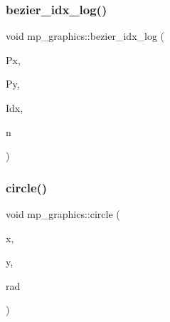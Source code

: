 \mbox{\label{classmp__graphics_a7f1683ce5b50f629b40e8116c8c866c1}} 
\subsubsection{\texorpdfstring{bezier\+\_\+idx\+\_\+log()}{bezier\_idx\_log()}}
{\footnotesize\ttfamily void mp\+\_\+graphics\+::bezier\+\_\+idx\+\_\+log (\begin{DoxyParamCaption}\item[{\mbox{\hyperlink{galois_8h_a09fddde158a3a20bd2dcadb609de11dc}{I\+NT}} $\ast$}]{Px,  }\item[{\mbox{\hyperlink{galois_8h_a09fddde158a3a20bd2dcadb609de11dc}{I\+NT}} $\ast$}]{Py,  }\item[{\mbox{\hyperlink{galois_8h_a09fddde158a3a20bd2dcadb609de11dc}{I\+NT}} $\ast$}]{Idx,  }\item[{\mbox{\hyperlink{galois_8h_a09fddde158a3a20bd2dcadb609de11dc}{I\+NT}}}]{n }\end{DoxyParamCaption})}

\mbox{\label{classmp__graphics_a0e1e32cdfd93dd41678a1dda2671ab6e}} 
\subsubsection{\texorpdfstring{circle()}{circle()}}
{\footnotesize\ttfamily void mp\+\_\+graphics\+::circle (\begin{DoxyParamCaption}\item[{\mbox{\hyperlink{galois_8h_a09fddde158a3a20bd2dcadb609de11dc}{I\+NT}}}]{x,  }\item[{\mbox{\hyperlink{galois_8h_a09fddde158a3a20bd2dcadb609de11dc}{I\+NT}}}]{y,  }\item[{\mbox{\hyperlink{galois_8h_a09fddde158a3a20bd2dcadb609de11dc}{I\+NT}}}]{rad }\end{DoxyParamCaption})}

\mbox{\label{classmp__graphics_a39416f00c1c310a76936674cdff82e49}} 
